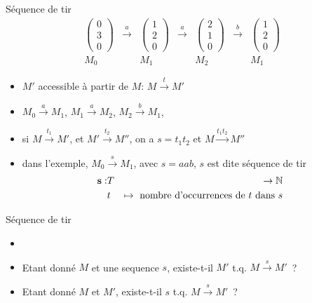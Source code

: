 \documentclass[compress]{beamer}
\begin{document}
\begin{frame}{Séquence de tir}
$$\begin{array}{ccccccc}
\begin{pmatrix} 0\\ 3\\ 0 \end{pmatrix} & \stackrel{a}{\longrightarrow} &
\begin{pmatrix} 1\\ 2\\ 0 \end{pmatrix} & \stackrel{a}{\longrightarrow} &
\begin{pmatrix} 2\\ 1\\ 0 \end{pmatrix} & \stackrel{b}{\longrightarrow} &
\begin{pmatrix} 1\\ 2\\ 0 \end{pmatrix}\\
M_0 & & M_1 & & M_2 & & M_1
\end{array}$$
\begin{itemize}
\item $M'$ accessible à  partir de $M$: $M \stackrel{t}{\longrightarrow} M'$
\item $M_0 \stackrel{a}{\longrightarrow} M_1$, $M_1 \stackrel{a}{\longrightarrow} M_2$, $M_2 \stackrel{b}{\longrightarrow} M_1$, 
\item si $M \stackrel{t_1}{\longrightarrow} M'$, et $M' \stackrel{t_2}{\longrightarrow} M''$, on a $s=t_1t_2$ et $M \stackrel{t_1t_2}{\longrightarrow} M''$
\item dans l'exemple, $M_0 \stackrel{s}{\longrightarrow} M_1$, avec $s=aab$, $s$ est dite séquence de tir
\begin{eqnarray*}
{\bf s} : &T& \rightarrow \mathbb{N}\\
		  &t& \mapsto \mbox{ nombre d'occurrences de $t$ dans $s$}
\end{eqnarray*}
\end{itemize}
\end{frame}

\begin{frame}{Séquence de tir}
\begin{itemize}
\item {} 
\item Etant donné $M$ et une sequence $s$, existe-t-il $M'$ t.q. $M \stackrel{s}{\longrightarrow} M'$~?
\item Etant donné $M$ et $M'$, existe-t-il $s$ t.q. $M \stackrel{s}{\longrightarrow} M'$~?
\end{itemize}
\end{frame}
 
\end{document}
